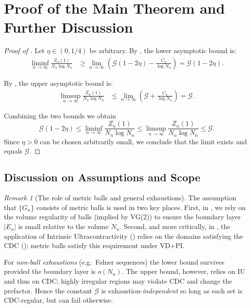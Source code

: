 \documentclass{article}
\numberwithin{equation}{section}
\theoremstyle{definition}
\theoremstyle{remark}
\newtheorem{remark}[theorem]{Remark}
\newcommand{\cG}{\mathcal{G}}    %
\begin{document}
\section{Proof of the Main Theorem and Further Discussion}\label{sec:discussion}

\begin{proof}[Proof of ]
Let $\eta \in (0,1/4)$ be arbitrary. By , the lower asymptotic bound is:
\begin{align*}
\liminf_{n \to \infty} \frac{Z_n(1)}{N_n \log N_n} &\geq \lim_{n \to \infty} \left( \cG(1-2\eta) - \frac{C_2}{\log N_n} \right) = \cG(1-2\eta).
\end{align*}

By , the upper asymptotic bound is:
\begin{align*}
\limsup_{n \to \infty} \frac{Z_n(1)}{N_n \log N_n} &\leq \lim_{n \to \infty} \left( \cG + \frac{C_4}{\log N_n} \right) = \cG.
\end{align*}

Combining the two bounds we obtain
\[
\cG(1-2\eta) \leq \liminf_{n \to \infty} \frac{Z_n(1)}{N_n \log N_n} \leq \limsup_{n \to \infty} \frac{Z_n(1)}{N_n \log N_n} \leq \cG.
\]
Since $\eta > 0$ can be chosen arbitrarily small, we conclude that the limit exists and equals $\cG$.
\end{proof}

\subsection{Discussion on Assumptions and Scope}

\begin{remark}[The role of metric balls and general exhaustions]
The assumption that $\{G_n\}$ consists of metric balls is used in two key places. First, in , we rely on the volume regularity of balls (implied by VG(2)) to ensure the boundary layer $|E_n|$ is small relative to the volume $N_n$. Second, and more critically, in , the application of Intrinsic Ultracontractivity () relies on the domains satisfying the CDC (); metric balls satisfy this requirement under VD+PI.

For \emph{non-ball exhaustions} (e.g.\ Følner sequences) the lower bound survives provided the boundary layer is $o(N_n)$. The upper bound, however, relies on IU and thus on CDC; highly irregular regions may violate CDC and change the prefactor. Hence the constant $\cG$ is exhaustion-\emph{independent} so long as each set is CDC-regular, but can fail otherwise.
\end{remark}
\end{document}

